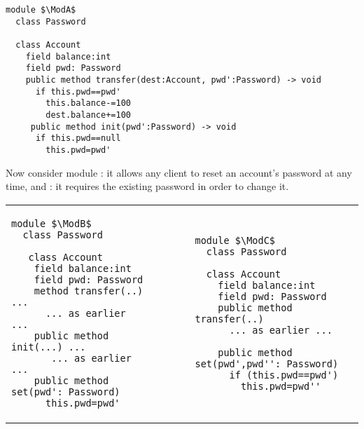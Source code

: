 \begin{lstlisting}[mathescape=true, language=Chainmail, frame=lines]
module $\ModA$        
  class Password
  
  class Account
    field balance:int 
    field pwd: Password
    public method transfer(dest:Account, pwd':Password) -> void
      if this.pwd==pwd'
        this.balance-=100
        dest.balance+=100
     public method init(pwd':Password) -> void
      if this.pwd==null
        this.pwd=pwd'
\end{lstlisting}
%
\noindent 
%
 
 \vspace{.1cm}
 
Now consider  module \ModB: it allows any client to reset an account's password at any time, and \ModC: it requires the existing password in order to change it.
  
  

\begin{tabular}{lll}
\begin{minipage}[b]{0.42\textwidth}
\begin{lstlisting}[mathescape=true, language=Chainmail, frame=lines]
module $\ModB$
  class Password
  
   class Account
    field balance:int 
    field pwd: Password 
    method transfer(..) ...
      ... as earlier ...
    public method init(...) ...
       ... as earlier ...
    public method set(pwd': Password)
      this.pwd=pwd'
\end{lstlisting}
\end{minipage}
&\ \ \  \ \   &%
\begin{minipage}[b]{0.45\textwidth}
\begin{lstlisting}[mathescape=true, language=chainmail, frame=lines]
module $\ModC$
  class Password

  class Account
    field balance:int 
    field pwd: Password 
    public method transfer(..) 
      ... as earlier ...
  
    public method set(pwd',pwd'': Password)
      if (this.pwd==pwd') 
        this.pwd=pwd''
\end{lstlisting}
\end{minipage} 
\end{tabular}

